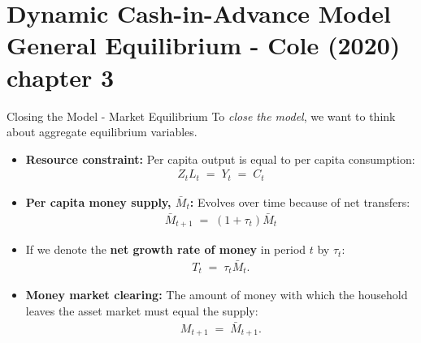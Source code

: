 \documentclass[10pt,c,aspectratio=1610,handout]{beamer}
\begin{document}
\section{Dynamic Cash-in-Advance Model\\\small{General Equilibrium - Cole (2020) chapter 3}}%
\begin{frame}{Closing the Model - Market Equilibrium}%
  To \emph{close the model}, we want to think about aggregate equilibrium variables.%
  \begin{itemize}%
    \item[$\blacktriangleright$] \textbf{Resource constraint:} Per capita output is equal to per capita consumption:%
    \begin{align*}%
      Z_{t} L_{t} \; = \; Y_{t} \; = \; C_{t}%
    \end{align*}%
    \pause%
    \item[$\blacktriangleright$] \textbf{Per capita money supply, $\bar{M}_{t}$:} Evolves over time because of net transfers:
    \begin{align*}%
      \bar{M}_{t+1} \; = \; (1+\tau_{t}) \bar{M}_{t}%
    \end{align*}%
    \pause%
    \item[$\blacktriangleright$] If we denote the \textbf{net growth rate of money} in period $t$ by $\tau _{t}$:%
    \begin{align*}%
      T_{t} \; = \; \tau_{t} \bar{M}_{t}.%
    \end{align*}%
    \pause%
    \item[$\blacktriangleright$] \textbf{Money market clearing:} The amount of money with which the household leaves the asset market must equal the supply:%
    \begin{align*}%
      M_{t+1} \; = \; \bar{M}_{t+1}.%
    \end{align*}%
  \end{itemize}%
\end{frame}%
\end{document}
